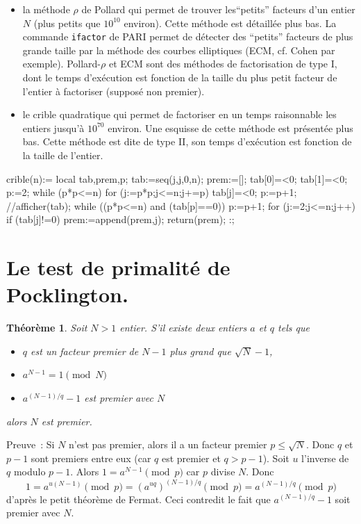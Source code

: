 \documentclass[a4paper,11pt]{book}
\newtheorem{thm}{Théorème}
\begin{document}
\begin{giacjshere}
\begin{itemize}
utiliser le test de Pocklington (voir la section
d\'edi\'ee) ou le test APRCL via PARI.
\item la m\'ethode $\rho$ de Pollard qui permet de trouver
les``petits'' facteurs d'un entier $N$ (plus petits que
$10^{10}$ environ). Cette m\'ethode est d\'etaill\'ee plus bas.
La commande \verb|ifactor| de PARI permet de d\'etecter
des ``petits'' facteurs de plus grande taille par la m\'ethode
des courbes elliptiques (ECM, cf. Cohen par exemple). Pollard-$\rho$
et ECM sont des m\'ethodes de factorisation de type I, dont le
temps d'ex\'ecution est fonction de la taille du plus petit facteur
de l'entier \`a factoriser (suppos\'e non premier).
\item le crible quadratique qui permet de factoriser
en un temps raisonnable les entiers jusqu'\`a $10^{70}$ environ.
Une esquisse de cette m\'ethode est pr\'esent\'ee plus bas.
Cette m\'ethode est dite de type II, son temps d'ex\'ecution
est fonction de la taille de l'entier.
\end{itemize}
\begin{giacprog}
crible(n):={
  local tab,prem,p;
  tab:=seq(j,j,0,n);
  prem:=[];
  tab[0]=<0; tab[1]=<0;
  p:=2;
  while (p*p<=n) {
    for (j:=p*p;j<=n;j+=p){
      tab[j]=<0;
    }
    p:=p+1;
    //afficher(tab);
    while ((p*p<=n) and (tab[p]==0)) {
      p:=p+1;
    } 
  }
  for (j:=2;j<=n;j++) {
    if (tab[j]!=0) { 
      prem:=append(prem,j);
    }
  } 
  return(prem);
}:;
\end{giacprog}

\section{Le test de primalit\'e de Pocklington.} 
\begin{thm}
Soit $N>1$ entier. S'il existe deux entiers $a$ et $q$ tels que
\begin{itemize}
\item $q$ est un facteur premier de $N-1$ plus grand que $\sqrt{N}-1$,
\item $a^{N-1}=1 \pmod N$
\item $a^{(N-1)/q}-1$ est premier avec $N$
\end{itemize}
alors $N$ est premier.
\end{thm}
Preuve~: Si $N$ n'est pas premier, alors il a un facteur premier
$p\leq \sqrt{N}$. Donc $q$ et $p-1$ sont premiers entre eux
(car $q$ est premier et $q>p-1$). Soit $u$ l'inverse de $q$ modulo
$p-1$. Alors $1=a^{N-1} \pmod p$ car $p$ divise $N$. Donc
$$ 1=a^{u(N-1)} \pmod p = \left(a^{uq}\right)^{(N-1)/q} \pmod p =
a^{(N-1)/q} \pmod p$$
d'apr\`es le petit th\'eor\`eme de Fermat. Ceci contredit 
le fait que $a^{(N-1)/q}-1$ soit premier avec $N$.


\end{giacjshere}
\end{document}
